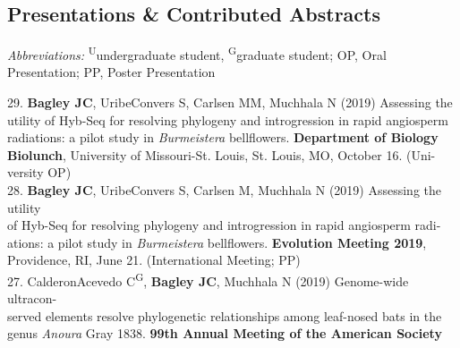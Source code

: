 \documentclass[margin,line]{res}
\begin{document}
\begin{resume}

\section{\sc Presentations \& Contributed Abstracts}

\emph{Abbreviations:} \textsuperscript{U}undergraduate student, \textsuperscript{G}graduate student; OP, Oral Presentation; PP, Poster Presentation

29. \textbf{Bagley JC}, Uribe\textendash Convers S, Carlsen MM, Muchhala N (2019) Assessing the\\
\hspace*{8mm} utility of Hyb-Seq for resolving phylogeny and introgression in rapid angiosperm\\
\hspace*{8mm} radiations: a pilot study in \emph{Burmeistera} bellflowers. \textbf{Department of Biology}\\
\hspace*{8mm} \textbf{Biolunch}, University of Missouri-St. Louis, St. Louis, MO, October 16. (Uni-\\ \vspace{2mm}
\hspace*{8mm}versity OP) \\
28. \textbf{Bagley JC}, Uribe\textendash Convers S, Carlsen M, Muchhala N (2019) Assessing the utility\\
\hspace*{8mm} of Hyb-Seq for resolving phylogeny and introgression in rapid angiosperm radi-\\
\hspace*{8mm} ations: a pilot study in \emph{Burmeistera} bellflowers. \textbf{Evolution Meeting 2019},\\ \vspace{2mm}
\hspace*{8mm}Providence, RI, June 21. (International Meeting; PP) \\
27. Calderon\textendash Acevedo C\textsuperscript{G}, \textbf{Bagley JC}, Muchhala N (2019) Genome-wide ultracon-\\
\hspace*{8mm} served elements resolve phylogenetic relationships among leaf-nosed bats in the\\
\hspace*{8mm} genus \emph{Anoura} Gray 1838. \textbf{99th Annual Meeting of the American Society}\\ \vspace{2mm}

\end{resume}
\end{document}
